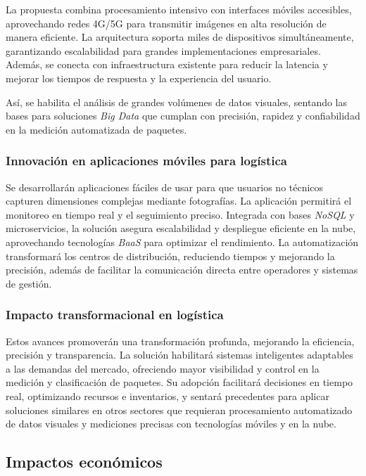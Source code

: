La propuesta combina procesamiento intensivo con interfaces móviles accesibles, aprovechando redes 4G/5G para transmitir imágenes en alta resolución de manera eficiente. La arquitectura soporta miles de dispositivos simultáneamente, garantizando escalabilidad para grandes implementaciones empresariales. Además, se conecta con infraestructura existente para reducir la latencia y mejorar los tiempos de respuesta y la experiencia del usuario.

Así, se habilita el análisis de grandes volúmenes de datos visuales, sentando las bases para soluciones \textit{Big Data} que cumplan con precisión, rapidez y confiabilidad en la medición automatizada de paquetes.

\subsubsection{Innovación en aplicaciones móviles para logística}

Se desarrollarán aplicaciones fáciles de usar para que usuarios no técnicos capturen dimensiones complejas mediante fotografías. La aplicación permitirá el monitoreo en tiempo real y el seguimiento preciso. Integrada con bases \textit{NoSQL} y microservicios, la solución asegura escalabilidad y despliegue eficiente en la nube, aprovechando tecnologías \textit{BaaS} para optimizar el rendimiento. La automatización transformará los centros de distribución, reduciendo tiempos y mejorando la precisión, además de facilitar la comunicación directa entre operadores y sistemas de gestión.

\subsubsection{Impacto transformacional en logística}

Estos avances promoverán una transformación profunda, mejorando la eficiencia, precisión y transparencia. La solución habilitará sistemas inteligentes adaptables a las demandas del mercado, ofreciendo mayor visibilidad y control en la medición y clasificación de paquetes. Su adopción facilitará decisiones en tiempo real, optimizando recursos e inventarios, y sentará precedentes para aplicar soluciones similares en otros sectores que requieran procesamiento automatizado de datos visuales y mediciones precisas con tecnologías móviles y en la nube.


\subsection{Impactos económicos}

